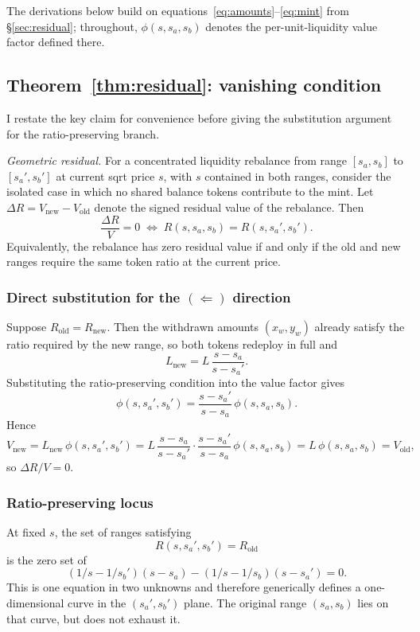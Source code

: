 \documentclass[11pt,a4paper]{article}
\theoremstyle{plain}
\begin{document}
The derivations below build on equations~\eqref{eq:amounts}--\eqref{eq:mint} from \S\ref{sec:residual}; throughout, $\phi(s, s_a, s_b)$ denotes the per-unit-liquidity value factor defined there.

\subsection{Theorem~\ref{thm:residual}: vanishing condition}

I restate the key claim for convenience before giving the substitution argument for the ratio-preserving branch.

\noindent\emph{Geometric residual.} For a concentrated liquidity rebalance from range $[s_a, s_b]$ to $[s_a', s_b']$ at current sqrt price $s$, with $s$ contained in both ranges, consider the isolated case in which no shared balance tokens contribute to the mint. Let $\Delta R = V_{\text{new}} - V_{\text{old}}$ denote the signed residual value of the rebalance. Then
\[
\frac{\Delta R}{V} = 0 \;\iff\; R(s, s_a, s_b) = R(s, s_a', s_b').
\]
Equivalently, the rebalance has zero residual value if and only if the old and new ranges require the same token ratio at the current price.

\subsubsection*{Direct substitution for the $(\Leftarrow)$ direction}

Suppose $R_{\text{old}} = R_{\text{new}}$. Then the withdrawn amounts $(x_w, y_w)$ already satisfy the ratio required by the new range, so both tokens redeploy in full and
\[
L_{\text{new}} = L\,\frac{s - s_a}{s - s_a'}.
\]
Substituting the ratio-preserving condition into the value factor gives
\[
\phi(s, s_a', s_b') = \frac{s - s_a'}{s - s_a}\,\phi(s, s_a, s_b).
\]
Hence
\[
V_{\text{new}}
= L_{\text{new}}\,\phi(s, s_a', s_b')
= L\,\frac{s - s_a}{s - s_a'} \cdot \frac{s - s_a'}{s - s_a}\,\phi(s, s_a, s_b)
= L\,\phi(s, s_a, s_b)
= V_{\text{old}},
\]
so $\Delta R/V = 0$.

\subsubsection*{Ratio-preserving locus}

At fixed $s$, the set of ranges satisfying
\[
R(s, s_a', s_b') = R_{\text{old}}
\]
is the zero set of
\[
(1/s - 1/s_b')(s - s_a) - (1/s - 1/s_b)(s - s_a') = 0.
\]
This is one equation in two unknowns and therefore generically defines a one-dimensional curve in the $(s_a', s_b')$ plane. The original range $(s_a, s_b)$ lies on that curve, but does not exhaust it.
\end{document}
